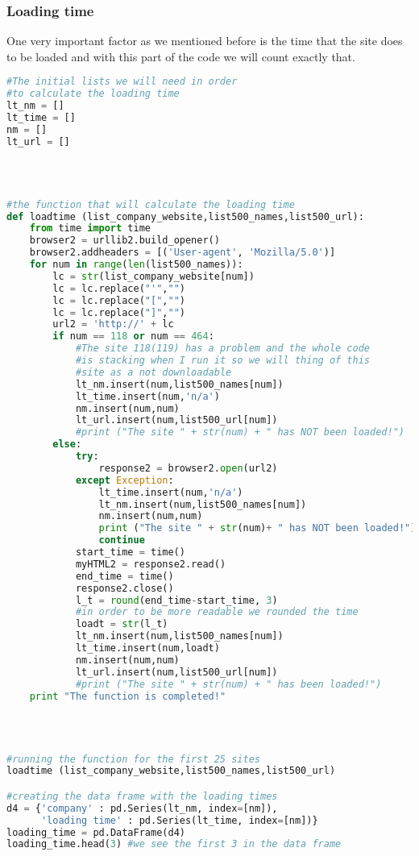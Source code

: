 \documentclass{article}
\begin{document}
\subsubsection{Loading time}
One very important factor as we mentioned before is the time that the site does to be loaded and with this part of the code we will count exactly that.
\begin{lstlisting}[language=Python]
#The initial lists we will need in order 
#to calculate the loading time
lt_nm = [] 
lt_time = []
nm = []
lt_url = []
 


 
#the function that will calculate the loading time
def loadtime (list_company_website,list500_names,list500_url):
    from time import time
    browser2 = urllib2.build_opener()
    browser2.addheaders = [('User-agent', 'Mozilla/5.0')]
    for num in range(len(list500_names)):
        lc = str(list_company_website[num])        
        lc = lc.replace("'","")   
        lc = lc.replace("[","")
        lc = lc.replace("]","")
        url2 = 'http://' + lc
        if num == 118 or num == 464:
            #The site 118(119) has a problem and the whole code 
            #is stacking when I run it so we will thing of this 
            #site as a not downloadable
            lt_nm.insert(num,list500_names[num])            
            lt_time.insert(num,'n/a')
            nm.insert(num,num)
            lt_url.insert(num,list500_url[num])
            #print ("The site " + str(num) + " has NOT been loaded!")
        else:
            try:
                response2 = browser2.open(url2)
            except Exception:
                lt_time.insert(num,'n/a')
                lt_nm.insert(num,list500_names[num])  
                nm.insert(num,num)
                print ("The site " + str(num)+ " has NOT been loaded!")
                continue     
            start_time = time()
            myHTML2 = response2.read()
            end_time = time()
            response2.close()
            l_t = round(end_time-start_time, 3) 
            #in order to be more readable we rounded the time
            loadt = str(l_t)
            lt_nm.insert(num,list500_names[num])            
            lt_time.insert(num,loadt)
            nm.insert(num,num)
            lt_url.insert(num,list500_url[num])
            #print ("The site " + str(num) + " has been loaded!")
    print "The function is completed!"
 


 
#running the function for the first 25 sites
loadtime (list_company_website,list500_names,list500_url)

#creating the data frame with the loading times
d4 = {'company' : pd.Series(lt_nm, index=[nm]),
      'loading time' : pd.Series(lt_time, index=[nm])}
loading_time = pd.DataFrame(d4)    
loading_time.head(3) #we see the first 3 in the data frame
\end{lstlisting}
\end{document}

